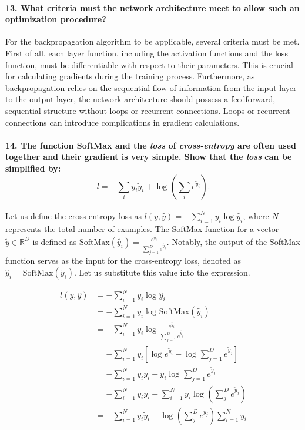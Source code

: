\documentclass{article}
\theoremstyle{plain}%
\theoremstyle{definition}
\theoremstyle{remark}
\begin{document}
\paragraph{13. What criteria must the network architecture meet to allow such an optimization procedure?}
For the backpropagation algorithm to be applicable, several criteria must be met. First of all, each layer function, including the activation functions and the loss function, must be differentiable with respect to their parameters. This is crucial for calculating gradients during the training process. Furthermore, as backpropagation relies on the sequential flow of information from the input layer to the output layer, the network architecture should possess a feedforward, sequential structure without loops or recurrent connections. Loops or recurrent connections can introduce complications in gradient calculations.

\paragraph{14. The function SoftMax and the \textit{loss} of \textit{cross-entropy} are often used together and their gradient is very simple. Show that the \textit{loss} can be simpliﬁed by:
    \[l = - \sum_{i}^{} y_i \tilde{y}_i + \log_{} (\sum_{i}^{} e^{\tilde{y}_i}).\]}
Let us define the cross-entropy loss as \( l(y, \hat{y}) = - \sum_{i=1}^{N} y_i \log \hat{y}_i \), where \( N \) represents the total number of examples. The SoftMax function for a vector \( \tilde{y} \in \mathbb{R}^D \) is defined as \( \text{SoftMax}(\tilde{y_i}) = \frac{e^{\tilde{y_i}}}{\sum_{j=1}^{D} e^{\tilde{y_j}}} \). Notably, the output of the SoftMax function serves as the input for the cross-entropy loss, denoted as \( \hat{y}_i = \text{SoftMax}(\tilde{y_i}) \). Let us substitute this value into the expression.

\begin{align*}
    l(y, \hat{y}) & = - \sum_{i=1}^{N} y_i \log_{} \hat{y}_i                                                                \\
                  & = - \sum_{i=1}^{N} y_i \log_{} \text{SoftMax}(\tilde{y_i})                                              \\
                  & = - \sum_{i=1}^{N} y_i \log_{} \frac{e^{\tilde{y_i}}}{\sum_{j=1}^{D} e^{\tilde{y_j}} }                  \\
                  & = - \sum_{i=1}^{N} y_i \left[ \log_{} e^{\tilde{y}_i} - \log_{} \sum_{j=1}^{D} e^{\tilde{y}_j}  \right] \\
                  & = - \sum_{i=1}^{N} y_i \tilde{y}_i - y_i \log_{} \sum_{j=1}^{D}e^{\tilde{y}_j}                          \\
                  & = - \sum_{i=1}^{N} y_i \tilde{y}_i + \sum_{i=1}^{N} y_i \log_{} (\sum_{j}^{D}e^{\tilde{y}_j}) \\
                  & = - \sum_{i=1}^{N} y_i \tilde{y}_i + \log_{} (\sum_{j}^{D}e^{\tilde{y}_j}) \sum_{i=1}^{N} y_i 
\end{align*}
\end{document}
